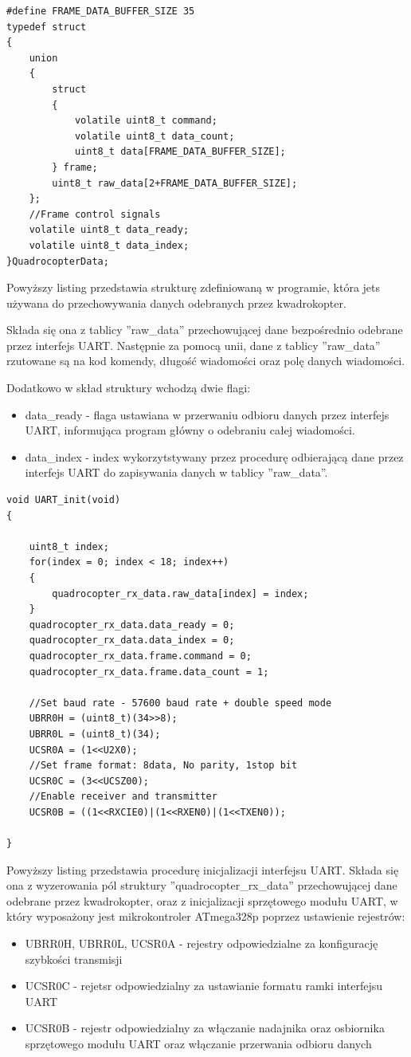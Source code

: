 \begin{lstlisting}
#define FRAME_DATA_BUFFER_SIZE 35
typedef struct
{
    union
    {
        struct
        {
            volatile uint8_t command;
            volatile uint8_t data_count;
            uint8_t data[FRAME_DATA_BUFFER_SIZE];
        } frame;
        uint8_t raw_data[2+FRAME_DATA_BUFFER_SIZE];
    };
    //Frame control signals
    volatile uint8_t data_ready;
    volatile uint8_t data_index;
}QuadrocopterData;
\end{lstlisting}

Powyższy listing przedstawia strukturę zdefiniowaną w programie, która jets używana do przechowywania danych odebranych  przez kwadrokopter.

Składa się ona z tablicy ''raw\_data'' przechowującej dane bezpośrednio odebrane przez interfejs UART. Następnie za pomocą unii, dane z tablicy ''raw\_data'' rzutowane są na kod komendy, długość wiadomości oraz polę danych wiadomości.

Dodatkowo w skład struktury wchodzą dwie flagi:
\begin{itemize}
	\item data\_ready - flaga ustawiana w przerwaniu odbioru danych przez interfejs UART, informująca program główny o odebraniu całej wiadomości.
	\item data\_index - index wykorzytstywany przez procedurę odbierającą dane przez interfejs UART do zapisywania danych w tablicy ''raw\_data''. 
\end{itemize}

\begin{lstlisting}
void UART_init(void)
{

    uint8_t index;
    for(index = 0; index < 18; index++)
    {
        quadrocopter_rx_data.raw_data[index] = index;
    }
    quadrocopter_rx_data.data_ready = 0;
    quadrocopter_rx_data.data_index = 0;
    quadrocopter_rx_data.frame.command = 0;
    quadrocopter_rx_data.frame.data_count = 1;

	//Set baud rate - 57600 baud rate + double speed mode
	UBRR0H = (uint8_t)(34>>8);
	UBRR0L = (uint8_t)(34);
	UCSR0A = (1<<U2X0);
	//Set frame format: 8data, No parity, 1stop bit
	UCSR0C = (3<<UCSZ00);
	//Enable receiver and transmitter
	UCSR0B = ((1<<RXCIE0)|(1<<RXEN0)|(1<<TXEN0));

}
\end{lstlisting}

Powyższy listing przedstawia procedurę inicjalizacji interfejsu UART. Składa się ona z wyzerowania pól struktury ''quadrocopter\_rx\_data'' przechowującej dane odebrane przez kwadrokopter, oraz z inicjalizacji sprzętowego modułu UART, w który wyposażony jest mikrokontroler ATmega328p poprzez ustawienie rejestrów:
\begin{itemize}
	\item UBRR0H, UBRR0L, UCSR0A - rejestry odpowiedzialne za konfigurację szybkości transmisji
	\item UCSR0C - rejetsr odpowiedzialny za ustawianie formatu ramki interfejsu UART
	\item UCSR0B - rejestr odpowiedzialny za włączanie nadajnika oraz osbiornika sprzętowego modułu UART oraz włączanie przerwania odbioru danych
\end{itemize}

